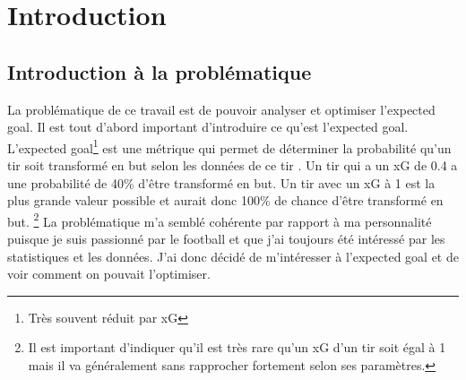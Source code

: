 \documentclass[12pt]{article}
\begin{document}
\newpage

\tableofcontents
\newpage

\section{Introduction}

\subsection{Introduction à la problématique}
\noindent La problématique de ce travail est de pouvoir analyser et optimiser l'expected goal.
\newline
Il est tout d'abord important d'introduire ce qu'est l'expected goal. L'expected goal\footnote{Très souvent réduit par xG} est une métrique qui permet de déterminer la probabilité qu'un tir soit transformé en but selon les données de ce tir \cite{XGExplainedFBref}. Un tir qui a un xG de 0.4 a une probabilité de 40\% d'être transformé en but. Un tir avec un xG à 1 est la plus grande valeur possible et aurait donc 100\% de chance d'être transformé en but. \footnote{Il est important d'indiquer qu'il est très rare qu'un xG d'un tir soit égal à 1 mais il va généralement sans rapprocher fortement selon ses paramètres.} \cite{pettyWhatExpectedGoals2018a}
\newline
La problématique m'a semblé cohérente par rapport à ma personnalité puisque je suis passionné par le football et que j'ai toujours été intéressé par les statistiques et les données. J'ai donc décidé de m'intéresser à l'expected goal et de voir comment on pouvait l'optimiser.
\end{document}
